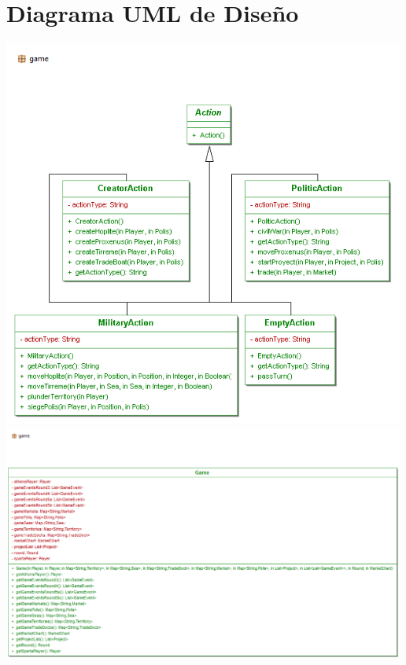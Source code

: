 \documentclass[11 pt]{book}
\begin{document}
\chapter{Diagrama UML de Diseño}
    \begin{center}
        \includegraphics[width=500px]{design-uml/game-actions.png}
        \includegraphics[width=500px]{design-uml/game-game.png}

\end{center}
\end{document}
